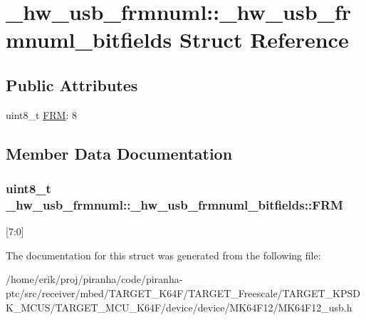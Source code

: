 \hypertarget{struct__hw__usb__frmnuml_1_1__hw__usb__frmnuml__bitfields}{}\section{\+\_\+hw\+\_\+usb\+\_\+frmnuml\+:\+:\+\_\+hw\+\_\+usb\+\_\+frmnuml\+\_\+bitfields Struct Reference}
\label{struct__hw__usb__frmnuml_1_1__hw__usb__frmnuml__bitfields}
\subsection*{Public Attributes}
\begin{DoxyCompactItemize}
\item 
uint8\+\_\+t \hyperlink{struct__hw__usb__frmnuml_1_1__hw__usb__frmnuml__bitfields_a4cb4bbaddc1052037a56bf34a3a23bb1}{F\+RM}\+: 8
\end{DoxyCompactItemize}


\subsection{Member Data Documentation}
\subsubsection[{\texorpdfstring{F\+RM}{FRM}}]{\setlength{\rightskip}{0pt plus 5cm}uint8\+\_\+t \+\_\+hw\+\_\+usb\+\_\+frmnuml\+::\+\_\+hw\+\_\+usb\+\_\+frmnuml\+\_\+bitfields\+::\+F\+RM}\hypertarget{struct__hw__usb__frmnuml_1_1__hw__usb__frmnuml__bitfields_a4cb4bbaddc1052037a56bf34a3a23bb1}{}\label{struct__hw__usb__frmnuml_1_1__hw__usb__frmnuml__bitfields_a4cb4bbaddc1052037a56bf34a3a23bb1}
\mbox{[}7\+:0\mbox{]} 

The documentation for this struct was generated from the following file\+:\begin{DoxyCompactItemize}
\item 
/home/erik/proj/piranha/code/piranha-\/ptc/src/receiver/mbed/\+T\+A\+R\+G\+E\+T\+\_\+\+K64\+F/\+T\+A\+R\+G\+E\+T\+\_\+\+Freescale/\+T\+A\+R\+G\+E\+T\+\_\+\+K\+P\+S\+D\+K\+\_\+\+M\+C\+U\+S/\+T\+A\+R\+G\+E\+T\+\_\+\+M\+C\+U\+\_\+\+K64\+F/device/device/\+M\+K64\+F12/M\+K64\+F12\+\_\+usb.\+h\end{DoxyCompactItemize}
